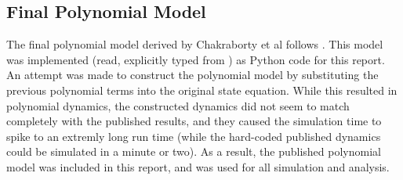 \documentclass[%
 reprint,
 amsmath,amssymb,
 aps,
]{revtex4-2}
\begin{document}
\subsection{Final Polynomial Model}
The final polynomial model derived by Chakraborty et al follows \cite{primary}. This model was implemented (read, explicitly typed from \cite{primary}) as Python code for this report. An attempt was made to construct the polynomial model by substituting the previous polynomial terms into the original state equation. While this resulted in polynomial dynamics, the constructed dynamics did not seem to match completely with the published results, and they caused the simulation time to spike to an extremly long run time (while the hard-coded published dynamics could be simulated in a minute or two). As a result, the published polynomial model was included in this report, and was used for all simulation and analysis.
\end{document}

